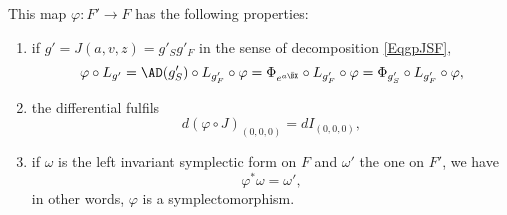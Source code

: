 \begin{proposition}
This map $\varphi\colon F'\to F$ has the following properties:
\begin{enumerate}
\item if $g'=J(a,v,z)=g'_{S}g'_{F}$ in the sense of decomposition \eqref{EqgpJSF},
\begin{equation}
\varphi\circ L_{g'}=\AD(g'_{S})\circ L_{g'_{F}}\circ\varphi=\Phi_{ e^{a\bar{\BX }}}\circ L_{g'_{F}}\circ\varphi=\Phi_{g'_{S}}\circ L_{g'_{F}}\circ\varphi,
\end{equation}
\item the differential fulfils
\begin{equation}
d(\varphi\circ J)_{(0,0,0)}=dI_{(0,0,0)},
\end{equation}
\item if $\omega$ is the left invariant symplectic form on $F$ and $\omega'$ the one on $F'$, we have
\[
  \varphi^*\omega=\omega',
\]
in other words, $\varphi$ is a symplectomorphism.

\end{enumerate}

\end{proposition}
